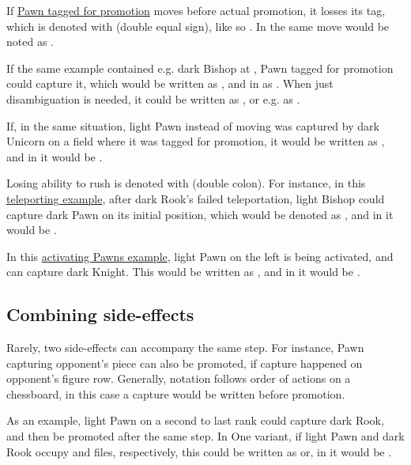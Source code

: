 If \hyperref[fig:scn_aoa_04_delayed_promo_pawn_2_tagged]{Pawn tagged for promotion}
moves before actual promotion, it losses its tag, which is denoted with \alg{==}
(double equal sign), like so . In  the same move would be
noted as .

If the same example contained e.g. dark Bishop at , Pawn tagged for promotion
could capture it, which would be written as , and in  as
. When just disambiguation is needed, it could be written as
, or e.g. as .

If, in the same situation, light Pawn instead of moving was captured by dark Unicorn
on a field where it was tagged for promotion, it would be written as ,
and in  it would be .

Losing ability to rush is denoted with \alg{::} (double colon). For instance, in
this \hyperref[fig:scn_n_03_teleport_move_2]{teleporting example}, after dark Rook's
failed teleportation, light Bishop could capture dark Pawn on its initial position,
which would be denoted as , and in  it would be
.

In this \hyperref[fig:scn_mv_007_activating_rush_pawn_init]{activating Pawns example},
light Pawn on the left is being activated, and can capture dark Knight. This would
be written as , and in 
it would be \alg{[Re6-e2]\textasciitilde{}[We2-c2]\textasciitilde{}[P::c2-b3*N]}.

\subsection*{Combining side-effects}
\label{sec:Appendix/Notation/Combining side-effects}

Rarely, two side-effects can accompany the same step. For instance, Pawn capturing
opponent's piece can also be promoted, if capture happened on opponent's figure row.
Generally, notation follows order of actions on a chessboard, in this case a capture
would be written before promotion.

As an example, light Pawn on a second to last rank could capture dark Rook, and
then be promoted after the same step. In One variant, if light Pawn and dark Rook
occupy  and  files, respectively, this could be written as
 or, in  it would be .

